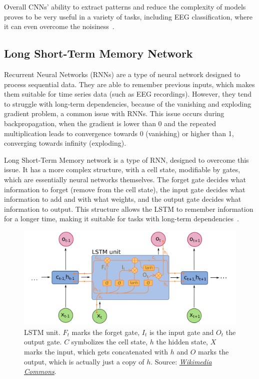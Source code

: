 \documentclass[english, he, bc, kiv, iso690alph]{fasthesis}
\begin{document}
Overall CNNs' ability to extract patterns and reduce the complexity of models proves to be very useful in a variety of tasks, including EEG classification, where it can even overcome the noisiness~\cite{zhang:similar:20}.

\subsection{Long Short-Term Memory Network}

Recurrent Neural Networks (RNNs) are a type of neural network designed to process sequential data. They are able to remember previous inputs, which makes them suitable for time series data (such as EEG recordings). However, they tend to struggle with long-term dependencies, because of the vanishing and exploding gradient problem, a common issue with RNNs. This issue occurs during backpropagation, when the gradient is lower than 0 and the repeated multiplication leads to convergence towards 0 (vanishing) or higher than 1, converging towards infinity (exploding).

Long Short-Term Memory network is a type of RNN, designed to overcome this issue. It has a more complex structure, with a cell state, modifiable by gates, which are essentially neural networks themselves. The forget gate decides what information to forget (remove from the cell state), the input gate decides what information to add and with what weights, and the output gate decides what information to output. This structure allows the LSTM to remember information for a longer time, making it suitable for tasks with long-term dependencies~\cite{olah:lstm:15}.

\begin{figure}[ht]
	\centering
	\includegraphics[width=\textwidth]{fig/lstm.png}
	\caption{LSTM unit. $F_t$ marks the forget gate, $I_t$ is the input gate and $O_t$ the output gate. $C$ symbolizes the cell state, $h$ the hidden state, $X$ marks the input, which gets concatenated with $h$ and $O$ marks the output, which is actually just a copy of $h$. Source: \href{https://commons.wikimedia.org/wiki/File:Long_Short-Term_Memory.svg}{\textit{Wikimedia Commons}}.}
\end{figure}
\end{document}
